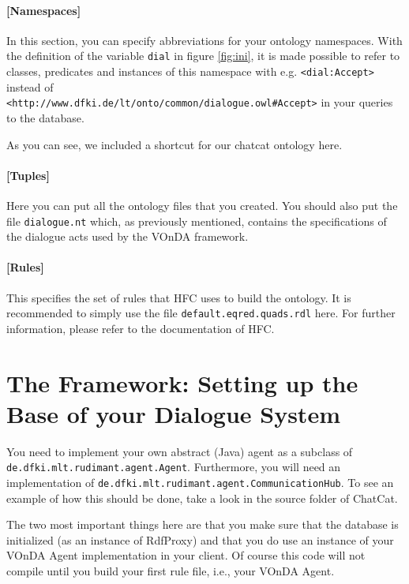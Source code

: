 \documentclass[a4paper]{report}
\newcommand{\vonda}{VOnDA\xspace}
\begin{document}
\paragraph{[Namespaces]}

In this section, you can specify abbreviations for your ontology
namespaces. With the definition of the variable \texttt{dial} in figure
\ref{fig:ini}, it is made possible to refer to classes, predicates and
instances of this namespace with e.g. \texttt{<dial:Accept>} instead of\\
\texttt{<http://www.dfki.de/lt/onto/common/dialogue.owl\#Accept>} in your
queries to the database.

As you can see, we included a shortcut for our chatcat ontology here.

\paragraph{[Tuples]}

Here you can put all the ontology files that you created. You should also put
the file \texttt{dialogue.nt} which, as previously mentioned, contains the
specifications of the dialogue acts used by the \vonda framework.

\paragraph{[Rules]}

This specifies the set of rules that HFC uses to build the ontology. It is
recommended to simply use the file \texttt{default.eqred.quads.rdl} here. For
further information, please refer to the documentation of HFC.


\section{The Framework: Setting up the Base of your Dialogue System}

You need to implement your own abstract (Java) agent as a subclass of
\texttt{de.dfki.mlt.rudimant.agent.Agent}. Furthermore, you will need an
implementation of \texttt{de.dfki.mlt.rudimant.agent.CommunicationHub}. To see
an example of how this should be done, take a look in the source folder of
ChatCat.

The two most important things here are that you make sure that the database is
initialized (as an instance of RdfProxy) and that you do use an instance of
your \vonda Agent implementation in your client. Of course this code will not
compile until you build your first rule file, i.e., your \vonda Agent.
\end{document}
